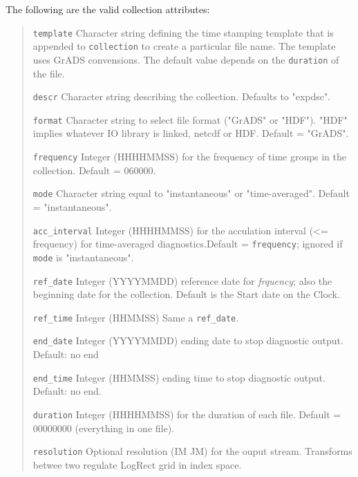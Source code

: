  The following are the valid collection attributes:
 \begin{quote}
 \begin{trivlist}
 \item[\tt template]      Character string defining the time stamping template that is appended 
                          to {\tt collection} to create a particular file name. 
                          The template uses GrADS convensions. 
                          The default value depends on the {\tt duration} of the file.
 \item[\tt descr]         Character string describing the collection. Defaults to "expdsc".
 \item[\tt format]        Character string to select file format ("GrADS" or "HDF").  "HDF" 
                          implies whatever IO library is linked, netcdf or HDF.
                          Default = "GrADS".
 \item[\tt frequency]     Integer (HHHHMMSS) for the frequency of time groups in the collection.
                          Default = 060000.
 \item[\tt mode]          Character string equal to "instantaneous" or "time-averaged".
                          Default = "instantaneous".
 \item[\tt acc\_interval] Integer (HHHHMMSS) for the acculation interval (<= frequency)
                          for time-averaged diagnostics.Default = {\tt frequency}; ignored
                          if {\tt mode} is "instantaneous".
 \item[\tt ref\_date]     Integer (YYYYMMDD) reference date for {\em frquency};
                          also the beginning date for
                          the collection. Default is the Start date on the Clock.
 \item[\tt ref\_time]     Integer (HHMMSS) Same a {\tt ref\_date}.
 \item[\tt end\_date]     Integer (YYYYMMDD) ending date to stop diagnostic output.
                          Default: no end
 \item[\tt end\_time]     Integer (HHMMSS) ending time to stop diagnostic output.
                          Default: no end.
 \item[\tt duration]      Integer (HHHHMMSS) for the duration of each file. 
                          Default = 00000000 (everything in one file).
 \item[\tt resolution]    Optional resolution (IM JM) for the ouput stream.
                          Transforms betwee two regulate LogRect grid in index space. 

\end{trivlist}
\end{quote}
